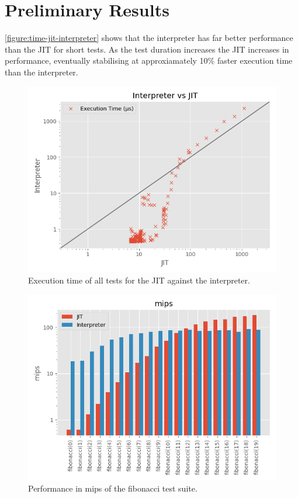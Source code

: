 \section{Preliminary Results}

\autoref{figure:time-jit-interpreter} shows that the interpreter has far better performance than the JIT for short tests. As the test duration increases the JIT increases in performance, eventually stabilising at approxiamately 10\% faster execution time than the interpreter.

\begin{figure}
    \centering
    \includegraphics{output/graphs/scatter/time.png}
    \caption{Execution time of all tests for the JIT against the interpreter.}
    \label{figure:time-jit-interpreter}
\end{figure}

\begin{figure}
    \centering
    \includegraphics{output/graphs/tests/fibonacci/mips.png}
    \caption{Performance in mips of the fibonacci test suite.}
    \label{figure:fibonacci-mips}
\end{figure}